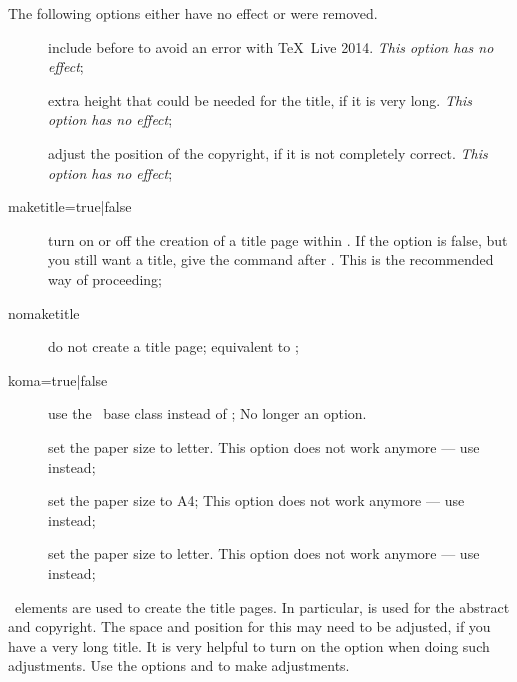 The following options either have no effect or were removed.
\begin{description}
\item[] include  before  to avoid
  an error with \TeX\ Live 2014.
  \emph{ This option has no effect};
\item[] extra height that could be needed for the title, if it is very long.
  \emph{ This option has no effect};
\item[] adjust the position of the copyright, if it is not completely correct.
  \emph{ This option has no effect};
\item[maketitle={\normalfont true}|false] turn on or off the creation of a title page within .
   If the option is false, but you still want a title, give the command  after
  \verb||.
  This is the recommended way of proceeding;
\item[nomaketitle]\mbox{}
    do not create a title page; equivalent to ;
\item[koma=true|{\normalfont false}] use the \KOMAScript\ base class  instead of ;
   No longer an option.
\item[] set the paper size to letter.
   This option does not work anymore
  --- use  instead;
\item[] set the paper size to A4;
   This option does not work anymore
  --- use  instead;
\item[] set the paper size to letter.
   This option does not work anymore
  --- use  instead;
\end{description}

 \KOMAScript\ elements are used to create the title pages.
In particular,  is used for the abstract and copyright.
The space and position for this may need to be adjusted,
if you have a very long title. 
It is very helpful to turn on the  option when doing such adjustments.
 Use the options
 and  to make adjustments.


